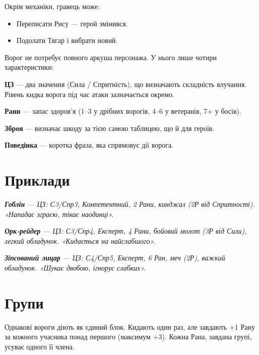 \documentclass[10pt,a4paper]{article}
\begin{document}
Окрім механіки, гравець може:
\begin{itemize}[leftmargin=*,itemsep=2pt]
\item Переписати Рису — герой змінився.
\item Подолати Тягар і вибрати новий.
\end{itemize}
Ворог не потребує повного аркуша персонажа. У нього лише чотири характеристики:

\textbf{ЦЗ} — два значення (Сила / Спритність), що визначають складність влучання. Рівень кидка ворога під час атаки зазначається окремо.

\textbf{Рани} — запас здоров'я (1–3 у дрібних ворогів, 4–6 у ветеранів, 7+ у босів).

\textbf{Зброя} — визначає шкоду за тією самою таблицею, що й для героїв.

\textbf{Поведінка} — коротка фраза, яка спрямовує дії ворога.
\section*{Приклади}

\textbf{\textit{Гоблін}}\textit{ — ЦЗ: С3/Спр3, Компетентний, 2 Рани, кинджал (2Р від Спритності). «Нападає зграєю, тікає наодинці».}

\textbf{\textit{Орк-рейдер}}\textit{ — ЦЗ: С3/Спр4, Експерт, 4 Рани, бойовий молот (3Р від Сили), легкий обладунок. «Кидається на найслабшого».}

\textbf{\textit{Зіпсований лицар}}\textit{ — ЦЗ: С4/Спр5, Експерт, 6 Ран, меч (2Р), важкий обладунок. «Шукає двобою, ігнорує слабких».}

\section*{Групи}
Однакові вороги діють як єдиний блок. Кидають один раз, але завдають +1 Рану за кожного учасника понад першого (максимум +3). Кожна Рана, завдана групі, усуває одного її члена.
\end{document}
